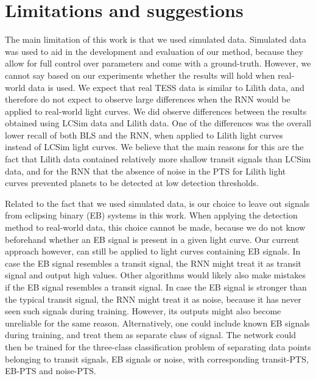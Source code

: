 
\section{Limitations and suggestions}


The main limitation of this work is that we used simulated data. Simulated data was used to aid in the development and evaluation of our method,  because they allow for full control over parameters and come with a ground-truth.  However, we cannot say based on our experiments whether the results will hold when real-world data is used. We expect that real TESS data is similar to Lilith data, and therefore do not expect to observe large differences when the RNN would be applied to real-world light curves.  We did observe differences between the results obtained using LCSim data and Lilith data. One of the differences was the overall lower recall of both BLS and the RNN, when applied to Lilith light curves instead of LCSim light curves. We believe that the main reasons for this are the fact that Lilith data contained relatively more shallow transit signals than LCSim data, and for the RNN that the absence of noise in the PTS for Lilith light curves prevented planets to be detected at low detection thresholds. 

Related to the fact that we used simulated data, is our choice to leave out signals from eclipsing binary (EB) systems in this work. When applying the detection method to real-world data, this choice cannot be made, because we do not know beforehand whether an EB signal is present in a given light curve. Our current approach however, can still be applied to  light curves containing EB signals. In case the EB signal resembles a transit signal, the RNN might treat it as transit signal and output high values. Other algorithms would likely also make mistakes if the EB signal resembles a transit signal. In case the EB signal is stronger than the typical transit signal, the RNN might treat it as noise, because it has never seen such signals during training. However, its outputs might also become unreliable for the same reason. Alternatively, one could include known EB signals during training, and treat them as separate class of signal. The network could then be trained for the three-class classification problem of separating data points belonging to transit signals, EB signals or noise, with corresponding transit-PTS, EB-PTS and noise-PTS.

